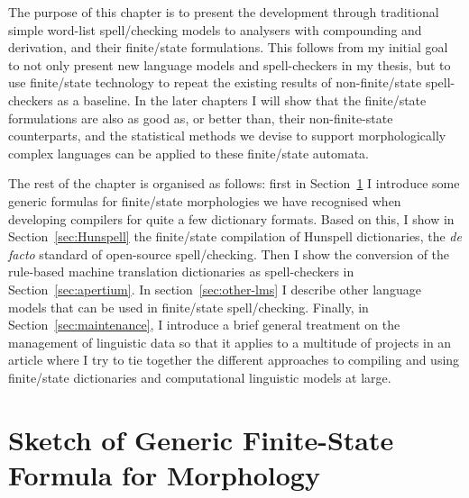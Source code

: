 \documentclass[officiallayout,final]{unihelcompling}
\begin{document}
The purpose of this chapter is to present the development through traditional
simple word-list spell\-/checking models to  analysers with compounding and derivation,
and their finite\-/state formulations.  This follows from my initial goal to
not only present new language models and spell-checkers in my thesis, but to
use finite\-/state technology to repeat the existing results of
non-finite\-/state spell-checkers as a baseline. In the later chapters I will
show that the finite\-/state formulations are also as good as, or better than,
their non-finite-state counterparts, and the statistical methods we devise to
support morphologically complex languages can be applied to these
finite\-/state automata.

The rest of the chapter is organised as follows: first in
Section~\ref{sec:generic} I introduce some generic formulas for finite\-/state
morphologies we have recognised when developing compilers for quite a few
dictionary formats. Based on this, I show in Section~\ref{sec:Hunspell} the
finite\-/state compilation of Hunspell dictionaries, the \emph{de facto}
standard of open-source spell\-/checking.  Then I show the conversion of the
rule-based machine translation dictionaries as spell-checkers in
Section~\ref{sec:apertium}. In section~\ref{sec:other-lms} I describe other
language models that can be used in finite\-/state spell\-/checking. Finally,
in Section~\ref{sec:maintenance}, I introduce a brief general treatment on the
management of linguistic data so that it applies to a multitude of projects in
an article where I try to tie together the different approaches to compiling
and using finite\-/state dictionaries and computational linguistic models
at large.

\section{Sketch of Generic Finite-State Formula for Morphology}
\label{sec:generic}
\end{document}
